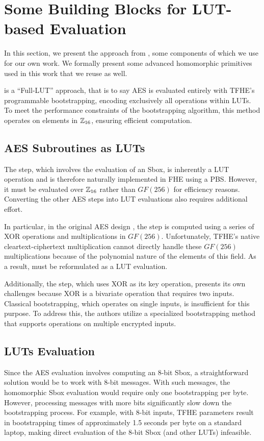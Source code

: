 
\section{Some Building Blocks for LUT-based Evaluation}
\label{sec:previous-blocks}


In this section, we present the approach from \cite{DBLP:conf/wahc/TramaCBS23}, some components of which we use for our own work. We formally present some advanced homomorphic primitives used in this work that we reuse as well.


\cite{DBLP:conf/wahc/TramaCBS23} is a ``Full-LUT'' approach, that is to say AES is evaluated entirely with TFHE's programmable bootstrapping, encoding exclusively all operations within LUTs. To meet the performance constraints of the bootstrapping algorithm, this method operates on elements in $\mathbb{Z}_{16}$, ensuring efficient computation.

\subsection{AES Subroutines as LUTs}

The \SubBytes step, which involves the evaluation of an Sbox, is inherently a LUT operation and is therefore naturally implemented in FHE using a PBS. However, it must be evaluated over $\mathbb{Z}_{16}$ rather than $GF(256)$ for efficiency reasons. Converting the other AES steps into LUT evaluations also requires additional effort.

In particular, in the original AES design \cite{aes-original}, the \MixColumns step is computed using a series of XOR operations and multiplications in $GF(256)$. Unfortunately, TFHE’s native cleartext-ciphertext multiplication cannot directly handle these $GF(256)$ multiplications because of the polynomial nature of the elements of this field. As a result, \MixColumns must be reformulated as a LUT evaluation.

Additionally, the \AddRoundKey step, which uses XOR as its key operation, presents its own challenges because XOR is a bivariate operation that requires two inputs. Classical bootstrapping, which operates on single inputs, is insufficient for this purpose. To address this, the authors utilize a specialized bootstrapping method that supports operations on multiple encrypted inputs.

\subsection{LUTs Evaluation} 
Since the AES evaluation involves computing an 8-bit Sbox, a straightforward solution would be to work with 8-bit messages. With such messages, the homomorphic Sbox evaluation would require only one bootstrapping per byte. However, processing messages with more bits significantly slow down the bootstrapping process. For example, with 8-bit inputs, TFHE parameters result in bootstrapping times of approximately 1.5 seconds per byte on a standard laptop, making direct evaluation of the 8-bit Sbox (and other LUTs) infeasible.

